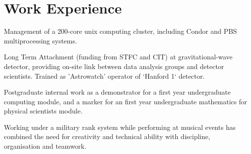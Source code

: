 \section{Work Experience}

 Management of a 200-core unix computing cluster, including Condor and PBS multiprocessing systems.

 Long Term Attachment (funding from STFC and CIT) at gravitational-wave detector, providing on-site link between data analysis groups and detector scientists. Trained as 'Astrowatch' operator of `Hanford 1` detector.

 Postgraduate internal work as a demonstrator for a first year undergraduate computing module, and a marker for an first year undergraduate mathematics for physical scientists module.

 Working under a military rank system while
performing at musical events has combined the need for creativity
and technical ability with discipline, organisation and teamwork.
